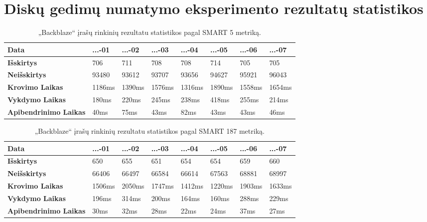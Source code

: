 \documentclass{VUMIFPSkursinis}
\begin{document}
\section{Diskų gedimų numatymo eksperimento rezultatų statistikos}
\begin{table}[H]
\centering
\caption{„Backblaze“ įrašų rinkinių rezultatu statistikos pagal SMART 5 metriką.}
\label{tab:time5}
{\begin{tabular}{|l|l|l|l|l|l|l|l|}
\hline
\textbf{Data}                 & ...-01	   & ...-02     & ...-03     & ...-04 	  & ...-05     & ...-06     & ...-07     \\ \hline
\textbf{Išskirtys}            & 706        & 711        & 708        & 708        & 714        & 705        & 705        \\ \hline
\textbf{Neišskirtys}          & 93480      & 93612      & 93707      & 93656      & 94627      & 95921      & 96043      \\ \hline
\textbf{Krovimo Laikas}       & 1186ms     & 1390ms     & 1576ms     & 1316ms     & 1890ms     & 1558ms     & 1654ms     \\ \hline
\textbf{Vykdymo Laikas}       & 180ms      & 220ms      & 245ms      & 238ms      & 418ms      & 255ms      & 214ms      \\ \hline
\textbf{Apibendrinimo Laikas} & 40ms       & 75ms       & 43ms       & 82ms       & 43ms       & 43ms       & 46ms       \\ \hline
\end{tabular}}
\end{table}

\begin{table}[H]
\centering
\caption{„Backblaze“ įrašų rinkinių rezultatu statistikos pagal SMART 187 metriką.}
\label{tab:time187}
\begin{tabular}{|l|l|l|l|l|l|l|l|}
\hline
\textbf{Data}                 & ...-01	   & ...-02     & ...-03     & ...-04 	  & ...-05     & ...-06     & ...-07     \\ \hline
\textbf{Išskirtys}            & 650        & 655        & 651        & 654        & 654        & 659        & 660        \\ \hline
\textbf{Neišskirtys}          & 66406      & 66497      & 66584      & 66614      & 67563      & 68881      & 68997      \\ \hline
\textbf{Krovimo Laikas}       & 1506ms     & 2050ms     & 1747ms     & 1412ms     & 1220ms     & 1903ms     & 1633ms     \\ \hline
\textbf{Vykdymo Laikas}       & 196ms      & 314ms      & 200ms      & 164ms      & 160ms      & 288ms      & 229ms      \\ \hline
\textbf{Apibendrinimo Laikas} & 30ms       & 32ms       & 28ms       & 22ms       & 24ms       & 37ms       & 27ms       \\ \hline
\end{tabular}
\end{table}
\end{document}
